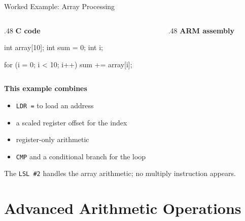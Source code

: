 \documentclass[9pt,aspectratio=169,xcolor=table]{beamer}
\begin{document}
\begin{frame}[fragile]{Worked Example: Array Processing}
	\begin{columns}[T]
		\begin{column}{.48\textwidth}
			\textbf{C code}
			\begin{cc}
	int array[10];
	int sum = 0;
	int i;

	for (i = 0; i < 10; i++) {
		sum += array[i];
	}
			\end{cc}
		\end{column}
		\begin{column}{.48\textwidth}
			\textbf{ARM assembly}
		\end{column}
	\end{columns}

	\vspace{3mm}
	\textbf{This example combines}
	{\small
		\begin{itemize}\itemsep1pt
			\item \texttt{LDR =} to load an address
			\item a \alert{scaled register offset} for the index
			\item register-only arithmetic
			\item \texttt{CMP} and a conditional branch for the loop
	\end{itemize}}

	\vspace{2mm}
	{\small The \texttt{LSL \#2} handles the array arithmetic;
		no multiply instruction appears.}
\end{frame}


\section{Advanced Arithmetic Operations}
\end{document}
